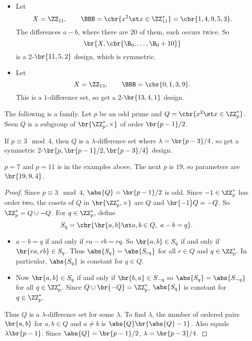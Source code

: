 \pagebreak

\begin{example*}
\hfill
\begin{itemize}
\item Let
$$ X = \ZZ_{11}, \qquad \BBB = \cbr{x^2 \st x \in \ZZ_{11}^*} = \cbr{1, 4, 9, 5, 3}. $$
The differences $ a - b $, where there are $ 20 $ of them, each occurs twice. So
$$ \br{X, \cbr{\B_0, \dots, \B_0 + 10}} $$
is a $ 2 $-$ \br{11, 5, 2} $ design, which is symmetric.
\item Let
$$ X = \ZZ_{13}, \qquad \BBB = \cbr{0, 1, 3, 9}. $$
This is a $ 1 $-difference set, so get a $ 2 $-$ \br{13, 4, 1} $ design.
\end{itemize}
\end{example*}

The following is a family. Let $ p $ be an odd prime and $ Q = \cbr{x^2 \st x \in \ZZ_p^*} $. Seen $ Q $ is a subgroup of $ \br{\ZZ_p^*, \times} $ of order $ \br{p - 1} / 2 $.

\begin{proposition}
If $ p \equiv 3 \mod 4 $, then $ Q $ is a $ \lambda $-difference set where $ \lambda = \br{p - 3} / 4 $, so get a symmetric $ 2 $-$ \br{p, \br{p - 1} / 2, \br{p - 3} / 4} $ design.
\end{proposition}

\begin{example*}
$ p = 7 $ and $ p = 11 $ is in the examples above. The next $ p $ is $ 19 $, so parameters are $ \br{19, 9, 4} $.
\end{example*}

\begin{proof}
Since $ p \equiv 3 \mod 4 $, $ \abs{Q} = \br{p - 1} / 2 $ is odd. Since $ -1 \in \ZZ_p^* $ has order two, the cosets of $ Q $ in $ \br{\ZZ_p^*, \times} $ are $ Q $ and $ \br{-1}Q = -Q $. So $ \ZZ_p^* = Q \cup -Q $. For $ q \in \ZZ_p^* $, define
$$ S_q = \cbr{\br{a, b} \st a, b \in Q, \ a - b = q}. $$
\begin{itemize}
\item $ a - b = q $ if and only if $ ra - rb = rq $. So $ \br{a, b} \in S_q $ if and only if $ \br{ra, rb} \in S_q $. Thus $ \abs{S_q} = \abs{S_{rq}} $ for all $ r \in Q $ and $ q \in \ZZ_p^* $. In particular, $ \abs{S_q} $ is constant for $ q \in Q $.
\item Now $ \br{a, b} \in S_q $ if and only if $ \br{b, a} \in S_{-q} $ so $ \abs{S_q} = \abs{S_{-q}} $ for all $ q \in \ZZ_p^* $. Since $ Q \cup \br{-Q} = \ZZ_p^* $, $ \abs{S_q} $ is constant for $ q \in \ZZ_p^* $.
\end{itemize}
Thus $ Q $ is a $ \lambda $-difference set for some $ \lambda $. To find $ \lambda $, the number of ordered pairs $ \br{a, b} $ for $ a, b \in Q $ and $ a \ne b $ is $ \abs{Q}\br{\abs{Q} - 1} $. Also equals $ \lambda\br{p - 1} $. Since $ \abs{Q} = \br{p - 1} / 2 $, $ \lambda = \br{p - 3} / 4 $.
\end{proof}


